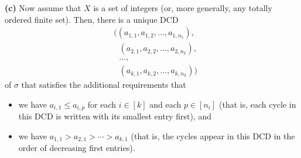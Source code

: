 \begin{theorem}
\textbf{(c)} Now assume that $X$ is a set of integers (or, more generally, any
totally ordered finite set). Then, there is a unique DCD
\begin{align*}
&  \Big(\left(  a_{1,1},a_{1,2},\ldots,a_{1,n_{1}}\right)  ,\\
&  \ \ \ \left(  a_{2,1},a_{2,2},\ldots,a_{2,n_{2}}\right)  ,\\
&  \ \ \ \ldots,\\
&  \ \ \ \left(  a_{k,1},a_{k,2},\ldots,a_{k,n_{k}}\right)  \Big)
\end{align*}
of $\sigma$ that satisfies the additional requirements that

\begin{itemize}
\item we have $a_{i,1}\leq a_{i,p}$ for each $i\in\left[  k\right]  $ and each
$p\in\left[  n_{i}\right]  $ (that is, each cycle in this DCD is written with
its smallest entry first), and

\item we have $a_{1,1}>a_{2,1}>\cdots>a_{k,1}$ (that is, the cycles appear in
this DCD in the order of decreasing first entries).
\end{itemize}
\end{theorem}


